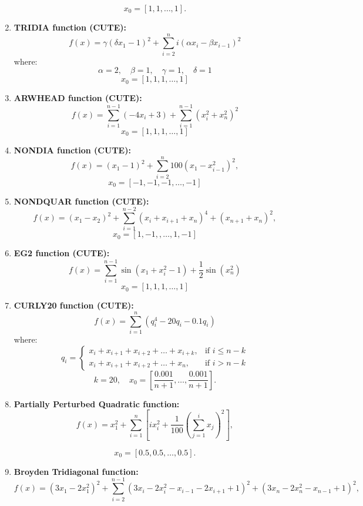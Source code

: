 \documentclass[10pt]{article}
\begin{document}
\begin{enumerate}
    \[
    x_0 = [1, 1, \ldots, 1].
    \]


    \item \textbf{TRIDIA function (CUTE):}
    \[
    f(x) = \gamma(\delta x_1 - 1)^2 + \sum_{i=2}^{n} i \left( \alpha x_i - \beta x_{i-1}\right)^2 
    \]
    where:
    \[
        \alpha = 2, \quad \beta = 1, \quad \gamma = 1, \quad \delta = 1
    \]
    \[
    x_0 = [1, 1, 1, \dots, 1]
    \]

    \item \textbf{ARWHEAD function (CUTE):}
    \[
    f(x) = \sum_{i=1}^{n-1} \left( -4x_i + 3 \right) + \sum_{i=1}^{n-1} \left(x_i^2 + x_n^2\right)^2
    \]
    \[
    x_0 = [1, 1, 1, \dots, 1]
    \]

    \item \textbf{NONDIA function (CUTE):}
    \[
    f(x) = (x_1 - 1)^2 + \sum_{i=2}^{n} 100\left(x_1 -  x_{i-1}^2\right)^2,
    \]
    \[
    x_0 = [-1, -1, -1, \dots, -1]
    \]

    \item \textbf{NONDQUAR function (CUTE):}
    \[
    f(x) = \left(x_1 - x_2\right)^2 + \sum_{i=1}^{n-2} \left( x_i + x_{i+1} + x_n \right)^4 + (x_{n+1} + x_n)^2,
    \]
    \[
    x_0 = [1, -1,, \dots, 1, -1]
    \]

    \item \textbf{EG2 function (CUTE):}
    \[
    f(x) = \sum_{i=1}^{n-1} \sin(x_1 + x_i^2 -1) + \frac{1}{2}\sin(x_n^2)
    \]
    \[
    x_0 = [1, 1, 1, \dots, 1]
    \]

    \item \textbf{CURLY20 function (CUTE):}
    \[
    f(x) = \sum_{i=1}^{n} \left( q_i^4 -20q_i - 0.1q_i \right)
    \]
    where:
    \[
    q_i = 
    \begin{cases} 
        x_i + x_{i+1} + x_{i+2} + \dots + x_{i+k}, & \text{if } i \leq n-k \\
        x_i + x_{i+1} + x_{i+2} + \dots + x_n, & \text{if } i > n-k
    \end{cases}
    \]
    \[
    k = 20, \quad x_0 = \left[ \frac{0.001}{n+1}, \ldots, \frac{0.001}{n+1} \right].
    \]

    \item \textbf{Partially Perturbed Quadratic function:}
    \[
    f(x) = x_1^2 + \sum_{i=1}^n \left[ i x_i^2 + \frac{1}{100} \left( \sum_{j=1}^i x_j \right)^2 \right],
    \]
    
    \[
    x_0 = [0.5, 0.5, \ldots, 0.5].
    \]

    \item \textbf{Broyden Tridiagonal function:}
    \[
    f(x) = \left( 3x_1 - 2x_1^2 \right)^2 + \sum_{i=2}^{n-1} \left( 3x_i - 2x_i^2 - x_{i-1} - 2x_{i+1} + 1 \right)^2 + \left( 3x_n - 2x_n^2 - x_{n-1} + 1 \right)^2,
    \]


\end{enumerate}
\end{document}
